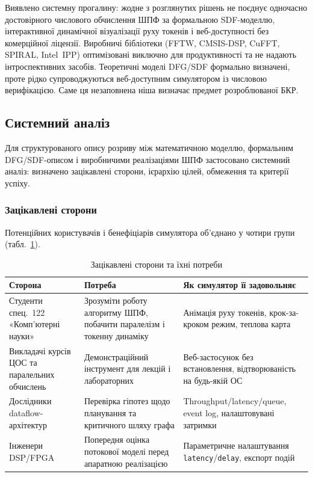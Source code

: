 \documentclass[14pt,a4paper]{extarticle}
\begin{document}
Виявлено системну прогалину: жодне з розглянутих рішень не поєднує
одночасно достовірного числового обчислення ШПФ за формальною
SDF-моделлю, інтерактивної динамічної візуалізації руху токенів і
веб-доступності без комерційної ліцензії. Виробничі бібліотеки
(FFTW, CMSIS-DSP, CuFFT, SPIRAL, Intel~IPP) оптимізовані виключно
для продуктивності та не надають інтроспективних засобів. Теоретичні
моделі DFG/SDF формально визначені, проте рідко супроводжуються
веб-доступним симулятором із числовою верифікацією. Саме ця
незаповнена ніша визначає предмет розроблюваної БКР.

\subsection{Системний аналіз}

Для структурованого опису розриву між математичною моделлю,
формальним DFG/SDF-описом і виробничими реалізаціями ШПФ застосовано
системний аналіз: визначено зацікавлені сторони, ієрархію цілей,
обмеження та критерії успіху.

\subsubsection*{Зацікавлені сторони}

Потенційних користувачів і бенефіціарів симулятора об'єднано у
чотири групи (табл.~\ref{tab:stakeholders}).

\begin{table}[H]
  \caption{Зацікавлені сторони та їхні потреби}
  \label{tab:stakeholders}
  \centering
  \small
  \begin{tabular}{p{3.4cm}p{4.6cm}p{5.4cm}}
    \toprule
    Сторона & Потреба & Як симулятор її задовольняє \\
    \midrule
    Студенти спец.~122 «Комп'ютерні науки» &
      Зрозуміти роботу алгоритму ШПФ, побачити паралелізм і токенну динаміку &
      Анімація руху токенів, крок-за-кроком режим, теплова карта \\[2pt]
    Викладачі курсів ЦОС та паралельних обчислень &
      Демонстраційний інструмент для лекцій і лабораторних &
      Веб-застосунок без встановлення, відтворюваність на будь-якій ОС \\[2pt]
    Дослідники dataflow-архітектур &
      Перевірка гіпотез щодо планування та критичного шляху графа &
      Throughput/latency/queue, event log, налаштовувані затримки \\[2pt]
    Інженери DSP/FPGA &
      Попередня оцінка потокової моделі перед апаратною реалізацією &
      Параметричне налаштування \texttt{latency}/\texttt{delay}, експорт подій \\
    \bottomrule
  \end{tabular}
\end{table}
\end{document}
